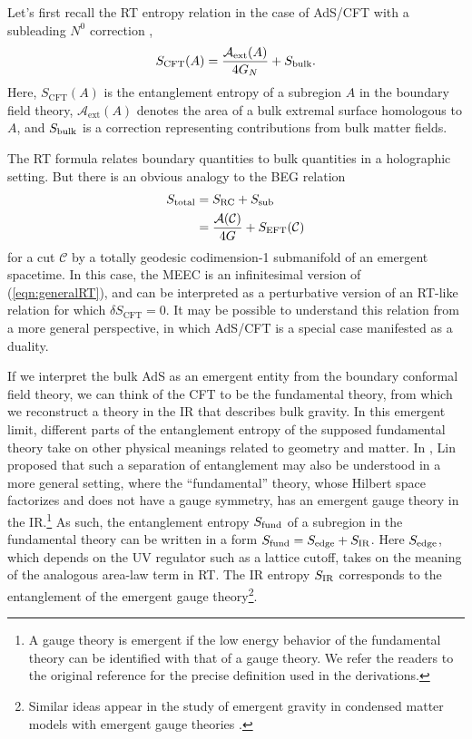 \documentclass[%
preprint,
nofootinbib,
amsmath,amssymb,
aps,
prd,
showpacs,
superscriptaddress
]{revtex4-1}
\newcommand{\area}{\mathcal{A}}
\begin{document}
Let's first recall the RT entropy relation in the case of AdS/CFT with a subleading $N^0$ correction \cite{Faulkner:2013ana},
\begin{equation}
S_{\mathrm{CFT}}(A) =\frac{\mathcal{A}_{\mathrm{ext}}(A)}{4G_N} +S_{\rm bulk}.
\label{eqn:RTwCorr}
\end{equation}
Here, $S_{\mathrm{CFT}}(A)$ is the entanglement entropy of a subregion $A$ in the boundary field theory,  $\mathcal{A}_{\mathrm{ext}}(A)$ denotes the area of a bulk extremal surface homologous to $A$, and $S_{\rm bulk}$ is a correction representing contributions from bulk matter fields. 

The RT formula relates boundary quantities to bulk quantities in a holographic setting.
But there is an obvious analogy to the BEG relation
\begin{align}
S_{\rm total} &= S_{\rm RC}+S_{\rm sub}\\ &= \frac{\area(\mathcal{C})}{4G} +S_{\rm EFT}(\mathcal{C})
\label{eqn:generalRT}
\end{align}
for a cut $\mathcal{C}$ by a totally geodesic codimension-1 submanifold of an emergent spacetime. 
In this case, the MEEC is an infinitesimal version of (\ref{eqn:generalRT}), and can be interpreted as a perturbative version of an RT-like relation for which $\delta S_{\mathrm{CFT}}=0$. It may be possible to understand this relation from a more general perspective, in which AdS/CFT is a special case manifested as a duality. 

If we interpret the bulk AdS as an emergent entity from the boundary conformal field theory, we can think of the CFT to be the fundamental theory, from which we reconstruct a theory in the IR that describes bulk gravity. In this emergent limit, different parts of the entanglement entropy of the supposed fundamental theory take on other physical meanings related to geometry and matter. In  \cite{Lin:2017uzr}, Lin proposed that such a separation of entanglement may also be understood in a more general setting, where the ``fundamental'' theory, whose Hilbert space factorizes and does not have a gauge symmetry, has an emergent gauge theory in the IR.\footnote{A gauge theory is emergent if the low energy behavior of the fundamental theory can be identified with that of a gauge theory. We refer the readers to the original reference for the precise definition used in the derivations.} As such, the entanglement entropy $S_{\rm fund}$ of a subregion in the fundamental theory can be written in a form $S_{\rm fund}= S_{\rm edge}+S_{\mathrm{IR}}$. Here $S_{\rm edge}$, which depends on the UV regulator such as a lattice cutoff, takes on the meaning of the analogous area-law term in RT. The IR entropy $S_{\rm IR}$ corresponds to the entanglement of the emergent gauge theory\footnote{Similar ideas appear in the study of emergent gravity in condensed matter models  \cite{Pretko:2017fbf} with emergent gauge theories  \cite{Gu:2009jh}.}. 
\end{document}
